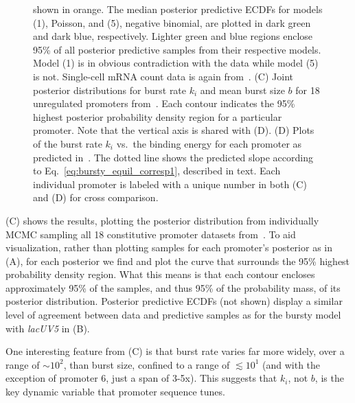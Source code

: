 \begin{figure}
{shown in orange. The median posterior predictive ECDFs for models (1), Poisson,
and (5), negative binomial, are plotted in dark green and dark blue,
respectively. Lighter green and blue regions enclose 95\% of all posterior
predictive samples from their respective models. Model (1) is in obvious
contradiction with the data while model (5) is not. Single-cell mRNA count data
is again from~\cite{Jones2014}. (C) Joint posterior distributions for burst rate
$k_i$ and mean burst size $b$ for 18 unregulated promoters
from~\cite{Jones2014}. Each contour indicates the 95\% highest posterior
probability density region for a particular promoter. Note that the vertical
axis is shared with (D). (D) Plots of the burst rate $k_i$ vs.\ the binding
energy for each promoter as predicted in~\cite{Brewster2012}. The dotted line
shows the predicted slope according to Eq.~\ref{eq:bursty_equil_corresp1},
described in text. Each individual promoter is
labeled with a unique number in both (C) and (D) for cross comparison.}
\label{fig:constit_post_full}
\end{figure}

(C) shows the results, plotting the posterior
distribution from individually MCMC sampling all 18 constitutive promoter
datasets from~\cite{Jones2014}. To aid visualization, rather than plotting
samples for each promoter's posterior as in (A), for
each posterior we find and plot the curve that surrounds the 95\% highest
probability density region. What this means is that each contour 
encloses approximately 95\% of the samples, and thus 95\% of the probability
mass, of its posterior distribution. Posterior predictive ECDFs (not shown)
display a similar level of agreement between data and predictive samples as for
the bursty model with \textit{lacUV5} in (B).

One interesting feature from (C) is that burst rate
varies far more widely, over a range of $\sim10^2$, than burst size, confined to
a range of $\lesssim10^1$ (and with the exception of promoter 6, just a span of
3-5x). This suggests that $k_i$, not $b$, is the key dynamic variable that
promoter sequence tunes.

